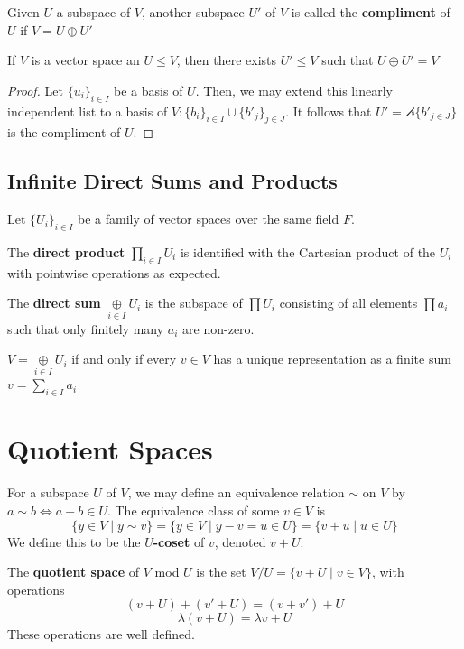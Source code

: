 \begin{defn}
    Given $U$ a subspace of $V$, another subspace $U'$ of $V$ is called the \textbf{compliment} of $U$ if $V=U \oplus U'$
\end{defn}

\begin{prop}
    If $V$ is a vector space an $U \leq V$, then there exists $U' \leq V$ such that $U \oplus U'=V$
\end{prop}

\begin{proof}
    Let $\{ u _i\} _{i \in I}$ be a basis of $U$. Then, we may extend this linearly independent list to a basis of $V: \{b_i\}_{i \in I}\cup \{b'_j\}_{j \in J}$. It follows that $U' = \angles{\{b'_{j \in J}\}}$ is the compliment of $U$.
\end{proof}

\subsection{Infinite Direct Sums and Products}

Let $\{U_i\}_{i \in I}$ be a family of vector spaces over the same field $F$.

\begin{defn}
    The \textbf{direct product} $\prod_{i \in I}U_i$ is identified with the Cartesian product of the $U_i$ with pointwise operations as expected.
\end{defn}

\begin{defn}
    The \textbf{direct sum} $\underset{i \in I}{\oplus}U_i$ is the subspace of $\prod U_i$ consisting of all elements $\prod a_i$ such that only finitely many $a_i$ are non-zero.
\end{defn}

\begin{prop}
    $V = \underset{i \in I}{\oplus}U_i$ if and only if every $v \in V$ has a unique representation as a finite sum $v = \sum _{i \in I}a_i$
\end{prop}

\section{Quotient Spaces}

\begin{defn}
    For a subspace $U$ of $V$, we may define an equivalence relation $\sim$ on $V$ by $a \sim b \iff a-b \in U$. The equivalence class of some $v \in V$ is
    $$\{ y \in V \mid y \sim v\} = \{ y \in V \mid y-v =u\in U\}=\{v+u \mid u \in U\}$$
    We define this to be the \textbf{$U$-coset} of $v$, denoted $v+U$.

    The \textbf{quotient space} of $V$ mod $U$ is the set $V/U = \{ v+U \mid v \in V\}$, with operations
    $$(v+U)+(v'+U)=(v+v')+U$$
    $$\lambda (v+U)=\lambda v + U$$
    These operations are well defined.
\end{defn}

